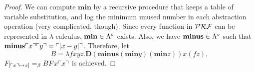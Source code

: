 \begin{proof}
We can compute $\mathbf{min}$ by a recursive procedure that keeps a table of variable substitution,
 and log the minimum unused number in each abstraction operation (very complicated, though).
 Since every function in $\mathcal{PRF}$ can be represented in $\lambda$-calculus,
 $\mathbf{min}\in\Lambda^\circ$ exists.
 Also, we have $\mathbf{minus}\in\Lambda^\circ$ such that 
 $\mathbf{minus}\ulcorner{x}\urcorner\ulcorner{y}\urcorner = 
 \ulcorner{|x-y|}\urcorner$. Therefore, let
\[
 B = \lambda fxyz. \mathbf{D}(\mathbf{minus} (\mathbf{min}y) (\mathbf{min}z))x(fz),
\]
$F_{[\ulcorner{x}\urcorner\mapsto x]} =_{\beta} BFx\ulcorner{x}\urcorner$
is achieved. 

\end{proof}